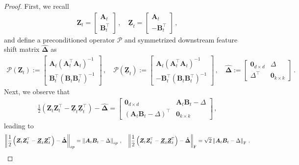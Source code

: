 \begin{proof}
First, we recall
\begin{align*}
    \bm Z_t = \begin{bmatrix}\bm A_t \\ \bm B_t^{\!\top}\end{bmatrix}\,,\quad \underline{\bm Z}_t = \begin{bmatrix}\bm A_t \\ -\bm B_t^{\!\top}\end{bmatrix}\,,
\end{align*}
and define a preconditioned operator $\mathcal{P}$ and symmetrized downstream feature shift matrix $\hat{\bm \Delta}$ as
\begin{align*}
    \mathcal{P}(\bm Z_t) := \begin{bmatrix}\bm A_t (\bm A_t^{\!\top}\bm A_t)^{-1} \\ \bm B_t^{\!\top}(\bm B_t\bm B_t^{\!\top})^{-1}\end{bmatrix}\,,\quad \mathcal{P}(\underline{\bm Z}_t) := \begin{bmatrix}\bm A_t (\bm A_t^{\!\top}\bm A_t)^{-1} \\ -\bm B_t^{\!\top}(\bm B_t\bm B_t^{\!\top})^{-1}\end{bmatrix}\,,\quad \hat{\bm \Delta}:=\begin{bmatrix}
        \bm 0_{d\times d} & \Delta \\
        \Delta^{\!\top} & \bm 0_{k\times k}
    \end{bmatrix}\,.
\end{align*}
Next, we observe that
\begin{align*}
    \frac{1}{2}\left(\bm Z_t\bm Z_t^{\!\top}-\underline{\bm Z}_t\underline{\bm Z}_t^{\!\top}\right)-\hat{\bm \Delta}=\begin{bmatrix}
        \bm 0_{d\times d} & \bm A_t \bm B_t - \Delta\\
        \left(\bm A_t \bm B_t - \Delta\right)^{\!\top} & \bm 0_{k\times k}
    \end{bmatrix}\,,
\end{align*}
leading to
\begin{align*}
    \left\|\frac{1}{2}\left(\bm Z_t\bm Z_t^{\!\top}-\underline{\bm Z}_t\underline{\bm Z}_t^{\!\top}\right)-\hat{\bm \Delta}\right\|_{op}=\left\|\bm A_t \bm B_t - \Delta\right\|_{op}\,,\quad \left\|\frac{1}{2}\left(\bm Z_t\bm Z_t^{\!\top}-\underline{\bm Z}_t\underline{\bm Z}_t^{\!\top}\right)-\hat{\bm \Delta}\right\|_{\rm F}=\sqrt{2}\left\|\bm A_t \bm B_t - \Delta\right\|_{\rm F}\,.

\end{align*}
\end{proof}
